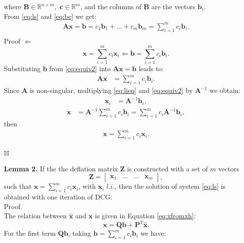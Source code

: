 \documentclass[12pt]{article}
\begin{document}
where $\mathbf{B} \in \mathbb{R}^{n\times m},$ $\mathbf{c} \in \mathbb{R}^{m}$, and the columns of $\mathbf{B}$
are the vectors $\mathbf{b}_i$.\\
From \eqref{eq:ls} and \eqref{eq:bc} we get:
\begin{align*}
\mathbf{A}\mathbf{x}=\mathbf{b}=c_1\mathbf{b}_1+...+c_m\mathbf{b}_m=\sum_{i=1}^m {c}_i\mathbf{b}_i.\\
\end{align*}
Proof $\Leftarrow $
\begin{equation}\label{eq:equiv2}
\mathbf{x}=\sum_{i=1}^m {c}_i\mathbf{x}_i\Leftarrow \mathbf{b}=\sum_{i=1}^m {c}_i\mathbf{b}_i .
\end{equation}
Substituting $\mathbf{b}$ from \eqref{eq:equiv2} into $\mathbf{A}\mathbf{x}=\mathbf{b}$ leads to:
\begin{align}%
\mathbf{A}\mathbf{x}&=\sum_{i=1}^m {c}_i\mathbf{b}_i.
\end{align}
Since $\mathbf{A}$ is non-singular, multiplying \eqref{eq:lieq} and \eqref{eq:equiv2} by $\mathbf{A}^{-1}$ we obtain:
\begin{align*}%
\mathbf{x}_i&=\mathbf{A}^{-1}\mathbf{b}_i,
\end{align*}
\begin{align*}%
\mathbf{x}&=\mathbf{A}^{-1}\sum_{i=1}^m {c}_i\mathbf{b}_i=\sum_{i=1}^m {c}_i\mathbf{A}^{-1}\mathbf{b}_i,
\end{align*}
then 
\begin{align}\label{eq:equiv21}
\mathbf{x}=\sum_{i=1}^m {c}_i\mathbf{x}_i.
\end{align}
\begin{flushright}
$\boxtimes $                
\end{flushright}
\textbf{Lemma 2.}
If the the deflation matrix $\mathbf{Z}$ is constructed with a set of $m$ vectors 
\begin{equation}
 \mathbf{Z}=
\begin{bmatrix}
\mathbf{x}_1&...&...&\mathbf{x}_m
\end{bmatrix}, 
\end{equation}
such that $\mathbf{x}=\sum_{i=1}^m {c}_i\mathbf{x}_i$, with $\mathbf{x}_i$ $l.i.$, then the solution of
system \eqref{eq:ls} is obtained with one iteration of DCG.\\
Proof.\\
The relation between $\mathbf{\hat{x}}$ and $\mathbf{x}$ is given in Equation \eqref{eq:xfromxh}:
\begin{equation*}
    \mathbf{x}=\mathbf{Q}\mathbf{b}+\mathbf{P}^T\mathbf{\hat{x}}. 
\end{equation*}
For the first term $\mathbf{Q}\mathbf{b}$, taking $\mathbf{b}=\sum_{i=1}^m {c}_i\mathbf{b}_i$ we have:
\end{document}
